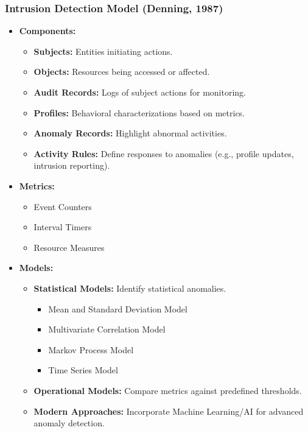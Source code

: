 \subsubsection{Intrusion Detection Model (Denning, 1987)}
\begin{itemize}
    \item \textbf{Components:}
    \begin{itemize}
        \item \textbf{Subjects:} Entities initiating actions.
        \item \textbf{Objects:} Resources being accessed or affected.
        \item \textbf{Audit Records:} Logs of subject actions for monitoring.
        \item \textbf{Profiles:} Behavioral characterizations based on metrics.
        \item \textbf{Anomaly Records:} Highlight abnormal activities.
        \item \textbf{Activity Rules:} Define responses to anomalies (e.g., profile updates, intrusion reporting).
    \end{itemize}
    \item \textbf{Metrics:}
    \begin{itemize}
        \item Event Counters
        \item Interval Timers
        \item Resource Measures
    \end{itemize}
    \item \textbf{Models:}
    \begin{itemize}
        \item \textbf{Statistical Models:} Identify statistical anomalies.
        \begin{itemize}
            \item Mean and Standard Deviation Model
            \item Multivariate Correlation Model
            \item Markov Process Model
            \item Time Series Model
        \end{itemize}
        \item \textbf{Operational Models:} Compare metrics against predefined thresholds.
        \item \textbf{Modern Approaches:} Incorporate Machine Learning/AI for advanced anomaly detection.
    \end{itemize}
\end{itemize}

